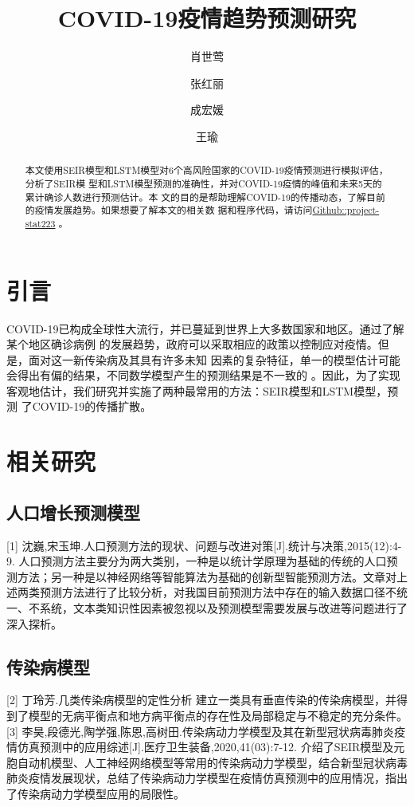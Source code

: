 \documentclass[lang=cn,11pt,a4paper,cite=authoryear]{elegantpaper}
\title{COVID-19疫情趋势预测研究}
\author{肖世莺 \and 张红丽 \and 成宏媛 \and 王瑜}
\date{}
\begin{document}
\maketitle

\begin{abstract}
本文使用SEIR模型和LSTM模型对6个高风险国家的COVID-19疫情预测进行模拟评估，分析了SEIR模
型和LSTM模型预测的准确性，并对COVID-19疫情的峰值和未来5天的累计确诊人数进行预测估计。本
文的目的是帮助理解COVID-19的传播动态，了解目前的疫情发展趋势。如果想要了解本文的相关数
据和程序代码，请访问\href{https://github.com/data-science-in-action/project-stat223}{Github::project-stat223}
。
\end{abstract}

\section{引言}
COVID-19已构成全球性大流行，并已蔓延到世界上大多数国家和地区。通过了解某个地区确诊病例
的发展趋势，政府可以采取相应的政策以控制应对疫情。但是，面对这一新传染病及其具有许多未知
因素的复杂特征，单一的模型估计可能会得出有偏的结果，不同数学模型产生的预测结果是不一致的
。因此，为了实现客观地估计，我们研究并实施了两种最常用的方法：SEIR模型和LSTM模型，预测
了COVID-19的传播扩散。

\section{相关研究}

\subsection{人口增长预测模型}

[1] 沈巍,宋玉坤.人口预测方法的现状、问题与改进对策[J].统计与决策,2015(12):4-9.
人口预测方法主要分为两大类别，一种是以统计学原理为基础的传统的人口预测方法；另一种是以神经网络等智能算法为基础的创新型智能预测方法。文章对上述两类预测方法进行了比较分析，对我国目前预测方法中存在的输入数据口径不统一、不系统，文本类知识性因素被忽视以及预测模型需要发展与改进等问题进行了深入探析。

\subsection{传染病模型}

[2] 丁玲芳.几类传染病模型的定性分析
建立一类具有垂直传染的传染病模型，并得到了模型的无病平衡点和地方病平衡点的存在性及局部稳定与不稳定的充分条件。
[3] 李昊,段德光,陶学强,陈恩,高树田.传染病动力学模型及其在新型冠状病毒肺炎疫情仿真预测中的应用综述[J].医疗卫生装备,2020,41(03):7-12.
介绍了SEIR模型及元胞自动机模型、人工神经网络模型等常用的传染病动力学模型，结合新型冠状病毒肺炎疫情发展现状，总结了传染病动力学模型在疫情仿真预测中的应用情况，指出了传染病动力学模型应用的局限性。
\end{document}
